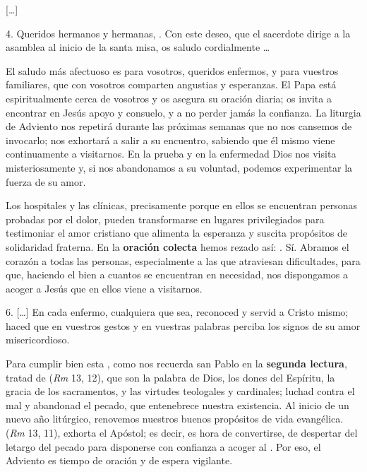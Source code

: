 \begin{body}
					{[}\ldots{}{]} 
					
					4. Queridos hermanos y hermanas, . Con este deseo, que el sacerdote dirige a la asamblea al inicio de la santa misa, os saludo cordialmente \ldots{} 
					
					El saludo más afectuoso es para vosotros, queridos enfermos, y para vuestros familiares, que con vosotros comparten angustias y esperanzas. El Papa está espiritualmente cerca de vosotros y os asegura su oración diaria; os invita a encontrar en Jesús apoyo y consuelo, y a no perder jamás la confianza. La liturgia de Adviento nos repetirá durante las próximas semanas que no nos cansemos de invocarlo; nos exhortará a salir a su encuentro, sabiendo que él mismo viene continuamente a visitarnos. En la prueba y en la enfermedad Dios nos visita misteriosamente y, si nos abandonamos a su voluntad, podemos experimentar la fuerza de su amor. 
					
					Los hospitales y las clínicas, precisamente porque en ellos se encuentran personas probadas por el dolor, pueden transformarse en lugares privilegiados para testimoniar el amor cristiano que alimenta la esperanza y suscita propósitos de solidaridad fraterna. En la \textbf{oración colecta} hemos rezado así: . Sí. Abramos el corazón a todas las personas, especialmente a las que atraviesan dificultades, para que, haciendo el bien a cuantos se encuentran en necesidad, nos dispongamos a acoger a Jesús que en ellos viene a visitarnos. 
					
					6. [\ldots{}] En cada enfermo, cualquiera que sea, reconoced y servid a Cristo mismo; haced que en vuestros gestos y en vuestras palabras perciba los signos de su amor misericordioso. 
					
					Para cumplir bien esta , como nos recuerda san Pablo en la \textbf{segunda lectura}, tratad de  (\emph{Rm} 13, 12), que son la palabra de Dios, los dones del Espíritu, la gracia de los sacramentos, y las virtudes teologales y cardinales; luchad contra el mal y abandonad el pecado, que entenebrece nuestra existencia. Al inicio de un nuevo año litúrgico, renovemos nuestros buenos propósitos de vida evangélica.  (\emph{Rm} 13, 11), exhorta el Apóstol; es decir, es hora de convertirse, de despertar del letargo del pecado para disponerse con confianza a acoger al . Por eso, el Adviento es tiempo de oración y de espera vigilante. 
					

\end{body}
